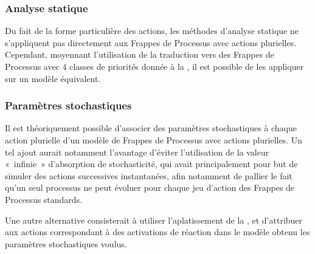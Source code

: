 \subsubsection{Analyse statique}

Du fait de la forme particulière des actions, les méthodes d'analyse statique ne s'appliquent pas
directement aux Frappes de Processus avec actions plurielles.
Cependant, moyennant l'utilisation de la traduction vers des Frappes de Processus
avec 4 classes de priorités donnée à la ,
il est possible de les appliquer sur un modèle équivalent.

\subsubsection{Paramètres stochastiques}

Il est théoriquement possible d'associer des paramètres stochastiques à chaque action plurielle
d'un modèle de Frappes de Processus avec actions plurielles.
Un tel ajout aurait notamment l'avantage d'éviter l'utilisation de la valeur «~infinie~»
d'absorption de stochasticité, qui avait principalement pour but de simuler des actions
successives instantanées, afin notamment de pallier le fait qu'un seul processus
ne peut évoluer pour chaque jeu d'action des Frappes de Processus standards.

Une autre alternative consisterait à utiliser l'aplatissement de la ,
et d'attribuer aux actions correspondant à des activations de réaction
dans le modèle obtenu les paramètres stochastiques voulus.
